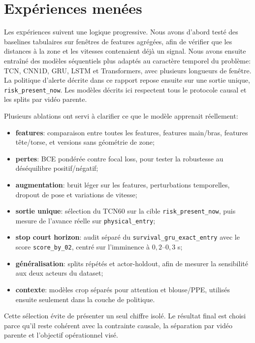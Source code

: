 \documentclass[11pt]{article}
\begin{document}
\section{Expériences menées}
Les expériences suivent une logique progressive. Nous avons d'abord testé des baselines tabulaires sur fenêtres de features agrégées, afin de vérifier que les distances à la zone et les vitesses contenaient déjà un signal. Nous avons ensuite entraîné des modèles séquentiels plus adaptés au caractère temporel du problème: TCN, CNN1D, GRU, LSTM et Transformers, avec plusieurs longueurs de fenêtre. La politique d'alerte décrite dans ce rapport repose ensuite sur une sortie unique, \texttt{risk\_present\_now}. Les modèles décrits ici respectent tous le protocole causal et les splits par vidéo parente.

Plusieurs ablations ont servi à clarifier ce que le modèle apprenait réellement:
\begin{itemize}[leftmargin=*]
\item \textbf{features}: comparaison entre toutes les features, features main/bras, features tête/torse, et versions sans géométrie de zone;
\item \textbf{pertes}: BCE pondérée contre focal loss, pour tester la robustesse au déséquilibre positif/négatif;
\item \textbf{augmentation}: bruit léger sur les features, perturbations temporelles, dropout de pose et variations de vitesse;
\item \textbf{sortie unique}: sélection du TCN60 sur la cible \texttt{risk\_present\_now}, puis mesure de l'avance réelle sur \texttt{physical\_entry};
\item \textbf{stop court horizon}: audit séparé du \texttt{survival\_gru\_exact\_entry} avec le score \texttt{score\_by\_02}, centré sur l'imminence à $0,2$--$0,3$ s;
\item \textbf{généralisation}: splits répétés et actor-holdout, afin de mesurer la sensibilité aux deux acteurs du dataset;
\item \textbf{contexte}: modèles crop séparés pour attention et blouse/PPE, utilisés ensuite seulement dans la couche de politique.
\end{itemize}

Cette sélection évite de présenter un seul chiffre isolé. Le résultat final est choisi parce qu'il reste cohérent avec la contrainte causale, la séparation par vidéo parente et l'objectif opérationnel visé.
\end{document}
